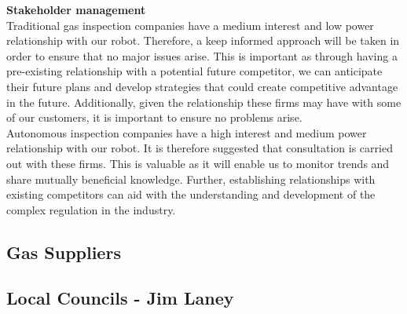 \documentclass[11pt]{article}		%
\begin{document}
            \textbf{Stakeholder management}\\
            Traditional gas inspection companies have a medium interest and low power relationship with our robot. Therefore, a keep informed approach will be taken in order to ensure that no major issues arise. This is important as through having a pre-existing relationship with a potential future competitor, we can anticipate their future plans and develop strategies that could create competitive advantage in the future. Additionally, given the relationship these firms may have with some of our customers, it is important to ensure no problems arise. \\
            \hspace*{3ex}Autonomous inspection companies have a high interest and medium power relationship with our robot. It is therefore suggested that consultation is carried out with these firms. This is valuable as it will enable us to monitor trends and share mutually beneficial knowledge. Further, establishing relationships with existing competitors can aid with the understanding and development of the complex regulation in the industry.

		\subsection[Gas Suppliers]{Gas Suppliers}
		
		\subsection[Local Councils]{Local Councils - Jim Laney}
			
\end{document}
